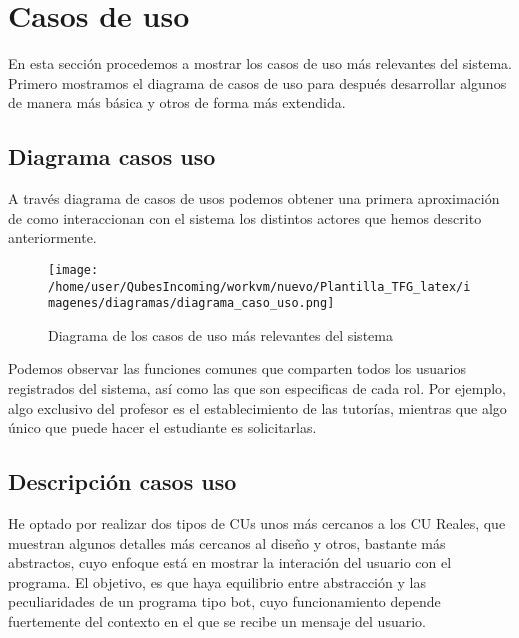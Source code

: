 \newpage

\section{Casos de uso}

En esta sección procedemos a mostrar los casos de uso más relevantes del sistema. Primero mostramos el diagrama de casos de uso para después desarrollar algunos de manera más básica y otros de forma  más extendida.

\subsection{Diagrama casos uso}

A través diagrama de casos de usos podemos obtener una primera aproximación de como interaccionan con el sistema los distintos actores  que hemos descrito anteriormente. 
\begin{figure}[H] %
\centering
\texttt{[image: /home/user/QubesIncoming/workvm/nuevo/Plantilla\_TFG\_latex/imagenes/diagramas/diagrama\_caso\_uso.png]}  %

\caption{Diagrama de los casos de uso más relevantes del sistema}\label{figura10}
\end{figure}

Podemos observar las funciones comunes que comparten todos los usuarios registrados del sistema, así como las que son especificas de cada rol. Por ejemplo, algo exclusivo del profesor es el establecimiento de las tutorías, mientras que algo único que puede hacer el estudiante es solicitarlas.


\subsection{Descripción casos uso}

He optado por realizar dos tipos de CUs unos más cercanos a los CU Reales, que muestran algunos detalles más cercanos al diseño y otros, bastante más abstractos, cuyo enfoque está en mostrar la interación del usuario con el programa. El objetivo, es que haya equilibrio entre abstracción y las peculiaridades de un programa tipo bot, cuyo funcionamiento depende fuertemente del contexto en el que se recibe un mensaje del usuario.


